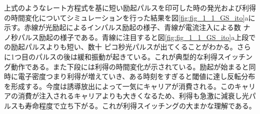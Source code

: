 上式のようなレート方程式を基に短い励起パルスを印可した時の発光および利得の時間変化についてシミュレーションを行った結果を図\ref{fig:fig_1_1_GS_ito}aに示す。赤線が光励起によるインパルス励起の様子、青線が電流注入による数 ナノ秒パルス励起の様子である。青線に注目すると図\ref{fig:fig_1_1_GS_ito}a上段での励起パルスよりも短い、数十 ピコ秒光パルスが出てくることがわかる。さらに1つ目のパルスの後は緩和振動が起きている。これが典型的な利得スイッチング動作である。また下段には利得の時間変化が示されている。励起が始まると同時に電子密度つまり利得が増えていき、ある時刻をすぎると閾値に達し反転分布を形成する。今度は誘導放出によって一気にキャリアが消費される。このキャリアの消費が注入されるキャリアよりも大きくなるため、利得も急激に減衰し光パルスも寿命程度で立ち下がる。これが利得スイッチングの大まかな理解である。

